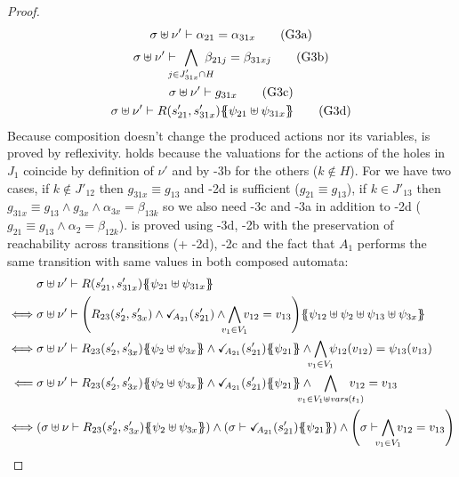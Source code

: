 \documentclass{article}
\begin{document}
\begin{proof}
	\begin{gather}
		\sigma \uplus \nu' \vdash \alpha_{21} = \alpha_{31x} \goal{3a} \\
		\sigma \uplus \nu' \vdash \bigwedge_\subbox{j \in J'_{31x} \cap H} \beta_{21j} = \beta_{31xj} \goal{3b} \\
		\sigma \uplus \nu' \vdash g_{31x} \goal{3c} \\
		\sigma \uplus \nu' \vdash R\mpar{s'_{21}, s'_{31x}}\psubst{\psi_{21} \uplus \psi_{31x}} \goal{3d}
	\end{gather}
	Because composition doesn't change the produced actions nor its variables,  is proved by reflexivity.
	 holds because the valuations for the actions of the holes in \(J_1\) coincide by definition of \(\nu'\) and by \hyp{3b} for the others (\(k \notin H\)).
	For  we have two cases, if \(k \notin J'_{12}\) then \(g_{31x} \equiv g_{13}\) and \hyp{2d} is sufficient (\(g_{21} \equiv g_{13}\)), if \(k \in J'_{13}\) then \(g_{31x} \equiv g_{13} \wedge g_{3x} \wedge \alpha_{3x} = \beta_{13k}\) so we also need \hyp{3c} and \hyp{3a} in addition to \hyp{2d} (\(g_{21} \equiv g_{13} \wedge \alpha_2 = \beta_{12k}\)).
	 is proved using \hyp{3d}, \hyp{2b} with the preservation of reachability across transitions (+ \hyp{2d}), \hyp{2c} and the fact that \(A_1\) performs the same transition with same values in both composed automata:
	\begin{align*}
		& \sigma \uplus \nu' \vdash R\mpar{s'_{21}, s'_{31x}}\psubst{\psi_{21} \uplus \psi_{31x}} \\
		\iff & \sigma \uplus \nu' \vdash \mpar{R_{23}\mpar{s'_2, s'_{3x}} \wedge \reach{A_{21}}\mpar{s'_{21}} \wedge \bigwedge_\subbox{v_1 \in V_1} v_{12} = v_{13}}\psubst{\psi_{12} \uplus \psi_2 \uplus \psi_{13} \uplus \psi_{3x}} \\
		\iff & \sigma \uplus \nu' \vdash R_{23}\mpar{s'_2, s'_{3x}}\psubst{\psi_2 \uplus \psi_{3x}} \wedge \reach{A_{21}}\mpar{s'_{21}}\psubst{\psi_{21}} \wedge \bigwedge_\subbox{v_1 \in V_1} \psi_{12}\mpar{v_{12}} = \psi_{13}\mpar{v_{13}} \\
		\impliedby & \sigma \uplus \nu' \vdash R_{23}\mpar{s'_2, s'_{3x}}\psubst{\psi_2 \uplus \psi_{3x}} \wedge \reach{A_{21}}\mpar{s'_{21}}\psubst{\psi_{21}} \wedge \bigwedge_\subbox{v_1 \in V_1 \uplus \fvars{t_1}} v_{12} = v_{13} \\
		\iff & \mpar{\sigma \uplus \nu \vdash R_{23}\mpar{s'_2, s'_{3x}}\psubst{\psi_2 \uplus \psi_{3x}}} \wedge \mpar{\sigma \vdash \reach{A_{21}}\mpar{s'_{21}}\psubst{\psi_{21}}} \wedge \mpar{\sigma \vdash \bigwedge_\subbox{v_1 \in V_1} v_{12} = v_{13}}

\end{align*}
\end{proof}
\end{document}
